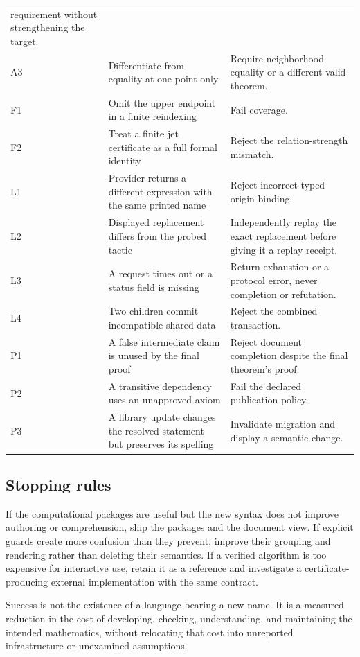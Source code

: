\documentclass[11pt,a4paper]{article}
\theoremstyle{remark}
\begin{document}
\begin{longtable}{@{}L{.07\textwidth}L{.47\textwidth}L{.38\textwidth}@{}}
requirement without strengthening the target.\\
A3 & Differentiate from equality at one point only & Require neighborhood
equality or a different valid theorem.\\
F1 & Omit the upper endpoint in a finite reindexing & Fail coverage.\\
F2 & Treat a finite jet certificate as a full formal identity & Reject the
relation-strength mismatch.\\
L1 & Provider returns a different expression with the same printed name &
Reject incorrect typed origin binding.\\
L2 & Displayed replacement differs from the probed tactic & Independently replay
the exact replacement before giving it a replay receipt.\\
L3 & A request times out or a status field is missing & Return exhaustion or a
protocol error, never completion or refutation.\\
L4 & Two children commit incompatible shared data & Reject the combined transaction.\\
P1 & A false intermediate claim is unused by the final proof & Reject document
completion despite the final theorem's proof.\\
P2 & A transitive dependency uses an unapproved axiom & Fail the declared publication
policy.\\
P3 & A library update changes the resolved statement but preserves its spelling &
Invalidate migration and display a semantic change.\\
\bottomrule
\end{longtable}

\subsection{Stopping rules}
If the computational packages are useful but the new syntax does not improve
authoring or comprehension, ship the packages and the document view. If explicit
guards create more confusion than they prevent, improve their grouping and
rendering rather than deleting their semantics. If a verified algorithm is too
expensive for interactive use, retain it as a reference and investigate a
certificate-producing external implementation with the same contract.

Success is not the existence of a language bearing a new name. It is a measured
reduction in the cost of developing, checking, understanding, and maintaining
the intended mathematics, without relocating that cost into unreported
infrastructure or unexamined assumptions.
\end{document}
